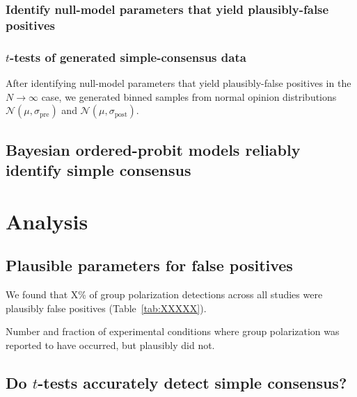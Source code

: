 \documentclass[11pt, letterpaper]{article}
\newcommand{\sigmapre}{\sigma_\mathrm{pre}}
\newcommand{\sigmapost}{\sigma_\mathrm{post}}
\newcommand{\normalpre}{\mathcal{N}(\mu, \sigmapre)}
\newcommand{\normalpost}{\mathcal{N}(\mu, \sigmapost)}
\begin{document}
\subsubsection{Identify null-model parameters that yield plausibly-false positives}



\subsubsection{$t$-tests of generated simple-consensus data}

After identifying null-model parameters that yield plausibly-false positives 
in the $N \to \infty$ case, we generated binned samples from normal opinion 
distributions $\normalpre$ and $\normalpost$.

\subsection{Bayesian ordered-probit models reliably identify simple consensus}



\section{Analysis}

\subsection{Plausible parameters for false positives}

We found that X\% of group polarization detections across all studies were 
plausibly false positives (Table~\ref{tab:XXXXX}).

\vspace{.5em}
% 
  \begin{table}
    \begin{center}
      \caption{Number and fraction of experimental conditions where group polarization was
               reported to have occurred, but plausibly did not.}
      \vspace{.5em}
      
    \end{center}
  \end{table}



\subsection{Do $t$-tests accurately detect simple consensus?}
\end{document}
